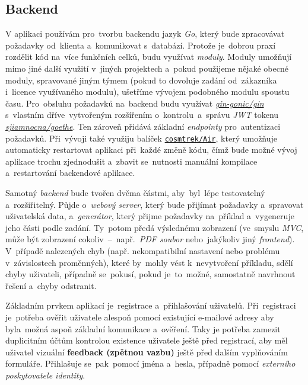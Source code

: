 \documentclass[10pt,a4paper]{article}
\begin{document}
        \subsection{Backend}
            V aplikaci používám pro~tvorbu backendu jazyk \emph{Go}, který bude zpracovávat požadavky od~klienta a~komunikovat s~databází.
            Protože je~dobrou praxí rozdělit kód na~více funkčních celků, budu využívat \emph{moduly}. Moduly umožňují mimo jiné další využití v~jiných projektech a~pokud použijeme nějaké obecné moduly, spravované jiným týmem (pokud to dovoluje zadání od~zákazníka i~licence využívaného modulu), ušetříme vývojem podobného modulu spoustu času. \cite{Zimmerman2023:howtowritebetter}
            Pro~obsluhu požadavků na~backend budu využívat \href{https://github.com/gin-gonic/gin}{\emph{gin-gonic/gin}} s~vlastním dříve~vytvořeným rozšířením o~kontrolu~a~správu \emph{JWT} tokenu \href{https://gitlab.com/sjiamnocna/goethe}{\emph{sjiamnocna/goethe}}. Ten zároveň přidává základní \emph{endpointy} pro~autentizaci požadavků.
            Při~vývoji také využiju balíček \href{https://github.com/cosmtrek/air}{\texttt{cosmtrek/Air}}, který umožňuje automaticky restartovat aplikaci při~každé změně kódu, čímž bude možné vývoj aplikace trochu zjednodušit a~zbavit se~nutnosti manuální kompilace a~restartování backendové aplikace.

            Samotný \emph{backend} bude tvořen dvěma částmi, aby~byl~lépe testovatelný a~rozšiřitelný. Půjde o~\emph{webový server}, který bude přijímat požadavky a~spravovat uživatelská data, a~\emph{generátor}, který přijme požadavky na~příklad a~vygeneruje jeho části podle zadání. Ty~potom předá výslednému zobrazení (ve~smyslu \emph{MVC}, může být zobrazení cokoliv~--~např.~\emph{PDF soubor} nebo~jakýkoliv jiný \emph{frontend}). V~případě nalezených chyb (např. nekompatibilní nastavení nebo problému v~závislostech proměnných), které by~mohly vést k~nevytvoření příkladu, sdělí chyby uživateli, případně se~pokusí, pokud je~to~možné, samostatně navrhnout řešení a~chyby odstranit.

            Základním prvkem aplikací je~registrace a~přihlašování uživatelů. Při~registraci je~potřeba ověřit uživatele alespoň pomocí existující e-mailové adresy aby byla~možná aspoň základní komunikace a~ověření. Taky je potřeba zamezit duplicitním účtům kontrolou existence uživatele ještě před registrací, aby měl uživatel vizuální \textbf{feedback (zpětnou vazbu)} ještě před dalším vyplňováním formuláře. Přihlašuje se~pak~pomocí jména a~hesla, případně pomocí \emph{externího poskytovatele identity}.
            
\end{document}
